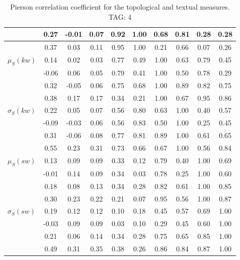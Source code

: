 \begin{table*}[h!]
\begin{center}
\begin{tabular}{| l | c | c | c | c | c | c | c | c | c |}
 & 0.27  & -0.01  & 0.07  & 0.92  & 1.00  & 0.68  & 0.81  & 0.28  & 0.28 \\\hline
 & 0.37  & 0.03  & 0.11  & 0.95  & 1.00  & 0.21  & 0.66  & 0.07  & 0.26 \\\hline
$\mu_S(kw)$ & 0.14  & 0.02  & 0.03  & 0.77  & 0.49  & 1.00  & 0.63  & 0.79  & 0.45 \\\hline
 & -0.06  & 0.06  & 0.05  & 0.79  & 0.41  & 1.00  & 0.50  & 0.78  & 0.29 \\\hline
 & 0.32  & -0.05  & 0.06  & 0.75  & 0.68  & 1.00  & 0.89  & 0.82  & 0.75 \\\hline
 & 0.38  & 0.17  & 0.17  & 0.34  & 0.21  & 1.00  & 0.67  & 0.95  & 0.86 \\\hline
$\sigma_S(kw)$ & 0.22  & 0.05  & 0.07  & 0.56  & 0.80  & 0.63  & 1.00  & 0.40  & 0.57 \\\hline
 & -0.09  & -0.03  & 0.06  & 0.56  & 0.83  & 0.50  & 1.00  & 0.25  & 0.45 \\\hline
 & 0.31  & -0.06  & 0.08  & 0.77  & 0.81  & 0.89  & 1.00  & 0.61  & 0.65 \\\hline
 & 0.55  & 0.23  & 0.31  & 0.73  & 0.66  & 0.67  & 1.00  & 0.56  & 0.84 \\\hline
$\mu_S(sw)$ & 0.13  & 0.09  & 0.09  & 0.33  & 0.12  & 0.79  & 0.40  & 1.00  & 0.69 \\\hline
 & -0.01  & 0.14  & 0.09  & 0.34  & 0.03  & 0.78  & 0.25  & 1.00  & 0.60 \\\hline
 & 0.18  & 0.08  & 0.13  & 0.34  & 0.28  & 0.82  & 0.61  & 1.00  & 0.85 \\\hline
 & 0.30  & 0.23  & 0.22  & 0.21  & 0.07  & 0.95  & 0.56  & 1.00  & 0.87 \\\hline
$\sigma_S(sw)$ & 0.19  & 0.12  & 0.12  & 0.10  & 0.18  & 0.45  & 0.57  & 0.69  & 1.00 \\\hline
 & -0.03  & 0.09  & 0.09  & 0.03  & 0.10  & 0.29  & 0.45  & 0.60  & 1.00 \\\hline
 & 0.21  & 0.06  & 0.14  & 0.34  & 0.28  & 0.75  & 0.65  & 0.85  & 1.00 \\\hline
 & 0.49  & 0.31  & 0.35  & 0.38  & 0.26  & 0.86  & 0.84  & 0.87  & 1.00 \\\hline
\end{tabular}
\caption{Pierson correlation coefficient for the topological and textual measures. TAG: 4}
\end{center}
\end{table*}